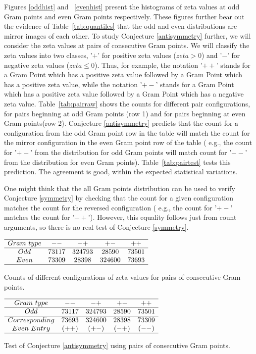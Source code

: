 \documentclass[twoside]{article}
\begin{document}
Figures \ref{oddhist} and ~\ref{evenhist}  present the histograms of zeta values at odd Gram points and even Gram points respectively. These figures further bear out the evidence of Table~\ref{tab:quantiles} that the odd and even distributions are mirror images of each other. To study Conjecture \ref{antisymmetry} further, we will consider the zeta values at pairs of consecutive Gram points. We will classify the zeta values into two classes, '$+$' for positive zeta values ($zeta > 0$) and '$-$' for negative zeta values ($zeta \leqslant  0$). Thus, for example, the notation '$++$' stands for a Gram Point which has a positive zeta value followed by a Gram Point which has a positive zeta value, while the notation '$+-$' stands for a Gram Point which has a positive zeta value followed by a Gram Point which has a negative zeta value. Table~\ref{tab:pairraw} shows the counts for different pair configurations, for pairs beginning at odd Gram points (row 1) and for pairs beginning at even Gram points(row 2). Conjecture \ref{antisymmetry} predicts that the count for a configuration from the odd Gram point row in the table  will match the count for the mirror configuration in the even Gram point row of the table ( e.g., the count for '$++$' from the distribution for odd Gram points will match count for '$--$' from the distribution for even Gram points). Table~\ref{tab:pairtest} tests this prediction. The agreement is good, within the expected statistical variations. 

One might think that the all Gram points distribution can be used to verify Conjecture \ref{symmetry} by checking that the count for a given configuration  matches the count for the reversed configuration ( e.g., the count for '$+-$'  matches the count for '$-+$'). However, this equality follows just from count arguments, so there is no real test of Conjecture \ref{symmetry}.

\begin{table}
\centering \(\begin{array}{ccccc}
\hline
 Gram~type&   --   & -+   & +-   & ++  \\
\hline
Odd & 73117& 324793& 28590& 73501 \\
Even & 73309& 28398& 324600& 73693 \\
\hline
\end{array}\)
\caption{Counts of different configurations of zeta values for pairs of consecutive Gram points.} \label{tab:pairraw}
\end{table}

\begin{table}
\centering \(\begin{array}{ccccc}
\hline
 Gram~type&   --   & -+   & +-   & ++  \\
\hline
Odd & 73117& 324793& 28590& 73501 \\
\hline
Corresponding& 73693 & 324600 & 28398& 73309\\ 
Even~Entry     & (++)     & (+-)   & (-+)  & (--) \\
\hline
\end{array}\)
\caption{Test of Conjecture \ref{antisymmetry} using pairs of consecutive Gram points.} \label{tab:pairtest}
\end{table}
\end{document}
